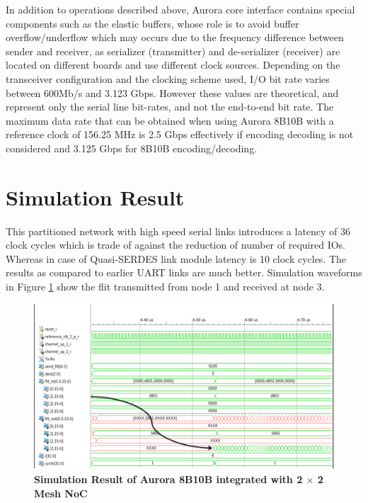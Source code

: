 In addition to operations described above, Aurora core interface contains special components such as the elastic buffers, whose role is to avoid buffer overflow/underflow which may occurs due to the frequency difference between sender and receiver, as serializer (transmitter) and de-serializer (receiver) are located on different boards and use different clock sources. Depending on the transceiver configuration and the clocking scheme used, I/O bit rate varies between 600Mb/s and 3.123 Gbps\cite{AuroraISE}. However these values are theoretical, and represent only the serial line bit-rates, and not the end-to-end bit rate.
The maximum data rate that can be obtained when using Aurora 8B10B with a reference clock of 156.25 MHz is 2.5 Gbps effectively if encoding decoding is not considered and 3.125 Gbps for 8B10B encoding/decoding. 

\section{Simulation Result}

This partitioned network with high speed serial links introduces a latency of 36 clock cycles which is trade of against the reduction of number of required IOs. Whereas in case of Quasi-SERDES link module latency is 10 clock cycles. The results as compared to earlier UART links are much better. Simulation waveforms in Figure \ref{AuroraSimulation} show the flit transmitted from node 1 and received at node 3.

\begin{figure}[H]
  \centering
   \includegraphics[scale=1]{./figs/AuroraSimulation}
  \caption{\textbf{Simulation Result of Aurora 8B10B integrated with 2 $\times$ 2 Mesh NoC}}
  \label{AuroraSimulation}
\end{figure}

